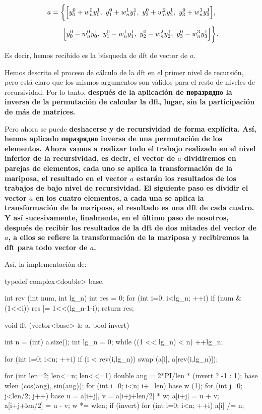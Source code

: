 $$ a = \biggl\{ \Bigl[ y_0^0+w_n^0y_0^1,\ y_1^0+w_n^1y_1^1,\ y_2^0+w_n^2y_2^1,\ y_3^0+w_n^3y_3^1 \Bigr], $$
$$ ~~~~~~~~ \Bigl[ y_0^0-w_n^0y_0^1,\ y_1^0-w_n^1y_1^1,\ y_2^0-w_n^2y_2^1,\ y_3^0-w_n^3y_3^1 \Bigr] \biggr\}. $$

Es decir, hemos recibido es la búsqueda de dft de vector de $a$.

Hemos descrito el proceso de cálculo de la dft en el primer nivel de recursión, pero está claro que los mismos argumentos son válidos para el resto de niveles de recursividad. Por lo tanto, \bf{después de la aplicación de поразрядно la inversa de la permutación de calcular la dft, lugar}, sin la participación de más de matrices.

Pero ahora se puede \bf{deshacerse y de recursividad} de forma explícita. Así, hemos aplicado поразрядно inversa de una permutación de los elementos. Ahora vamos a realizar todo el trabajo realizado en el nivel inferior de la recursividad, es decir, el vector de $a$ dividiremos en parejas de elementos, cada uno se aplica la transformación de la mariposa, el resultado en el vector $a$ estarán los resultados de los trabajos de bajo nivel de recursividad. El siguiente paso es dividir el vector $a$ en los cuatro elementos, a cada una se aplica la transformación de la mariposa, el resultado es una dft de cada cuatro. Y así sucesivamente, finalmente, en el último paso de nosotros, después de recibir los resultados de la dft de dos mitades del vector de $a$, a ellos se refiere la transformación de la mariposa y recibiremos la dft para todo vector de $a$.

Así, la implementación de:

\code
typedef complex<double> base.

int rev (int num, int lg_n) {
int res = 0;
for (int i=0; i<lg_n; ++i)
if (num & (1<<i))
res |= 1<<(lg_n-1-i);
return res;
}

void fft (vector<base> & a, bool invert) {
int n = (int) a.size();
int lg_n = 0;
while ((1 << lg_n) < n) ++lg_n;

for (int i=0; i<n; ++i)
if (i < rev(i,lg_n))
swap (a[i], a[rev(i,lg_n)]);

for (int len=2; len<=n; len<<=1) {
double ang = 2*PI/len * (invert ? -1 : 1);
base wlen (cos(ang), sin(ang));
for (int i=0; i<n; i+=len) {
base w (1);
for (int j=0; j<len/2; j++) {
base u = a[i+j], v = a[i+j+len/2] * w;
a[i+j] = u + v;
a[i+j+len/2] = u - v;
w *= wlen;
}
}
}
if (invert)
for (int i=0; i<n; ++i)
a[i] /= n;
}

\endcode

